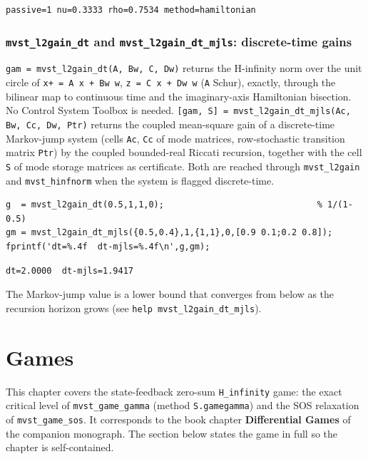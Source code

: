 \documentclass[11pt,oneside]{report}
\newcommand{\code}[1]{\texttt{#1}}
\begin{document}
\begin{lstlisting}[style=outputstyle]
passive=1 nu=0.3333 rho=0.7534 method=hamiltonian
\end{lstlisting}

\hypertarget{mvst_l2gain_dt-and-mvst_l2gain_dt_mjls-discrete-time-gains}{%
\subsection{\texorpdfstring{\code{mvst\_l2gain\_dt} and \code{mvst\_l2gain\_dt\_mjls}: discrete-time gains}{mvst\_l2gain\_dt and mvst\_l2gain\_dt\_mjls: discrete-time gains}}\label{mvst_l2gain_dt-and-mvst_l2gain_dt_mjls-discrete-time-gains}}

\code{gam = mvst\_l2gain\_dt(A, Bw, C, Dw)} returns the H-infinity norm over the unit
circle of \code{x+ = A x + Bw w}, \code{z = C x + Dw w} (\code{A} Schur), exactly, through the
bilinear map to continuous time and the imaginary-axis Hamiltonian bisection. No
Control System Toolbox is needed. \code{[gam, S] = mvst\_l2gain\_dt\_mjls(Ac, Bw, Cc, Dw, Ptr)} returns the coupled mean-square gain of a discrete-time Markov-jump
system (cells \code{Ac}, \code{Cc} of mode matrices, row-stochastic transition matrix
\code{Ptr}) by the coupled bounded-real Riccati recursion, together with the cell \code{S}
of mode storage matrices as certificate. Both are reached through \code{mvst\_l2gain}
and \code{mvst\_hinfnorm} when the system is flagged discrete-time.

\begin{lstlisting}[style=matlabstyle]
g  = mvst_l2gain_dt(0.5,1,1,0);                              % 1/(1-0.5)
gm = mvst_l2gain_dt_mjls({0.5,0.4},1,{1,1},0,[0.9 0.1;0.2 0.8]);
fprintf('dt=%.4f  dt-mjls=%.4f\n',g,gm);
\end{lstlisting}

\begin{lstlisting}[style=outputstyle]
dt=2.0000  dt-mjls=1.9417
\end{lstlisting}

The Markov-jump value is a lower bound that converges from below as the
recursion horizon grows (see \code{help mvst\_l2gain\_dt\_mjls}).


\hypertarget{chap:08-games}{%
\chapter{Games}\label{chap:08-games}}

This chapter covers the state-feedback zero-sum \code{H\_infinity} game: the exact
critical level of \code{mvst\_game\_gamma} (method \code{S.gamegamma}) and the SOS
relaxation of \code{mvst\_game\_sos}. It corresponds to the book chapter \textbf{Differential
Games} of the companion monograph. The section below states the game in full so
the chapter is self-contained.
\end{document}
